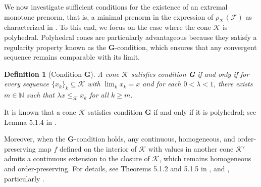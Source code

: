 \documentclass{article}
\newtheorem{definition}[theorem]{Definition}
\newcommand{\family}{\mathcal{F}}
\newcommand{\cradius}{\rho_{\cone}}
\newcommand{\cone}{\mathcal{K}}
\newcommand{\cleq}{\leq_{\cone}}
\begin{document}
We now investigate sufficient conditions for the existence of an extremal monotone prenorm, that is, a minimal prenorm in the expression of $\cradius(\family)$ as characterized in . To this end, we focus on the case where the cone $\cone$ is polyhedral. Polyhedral cones are particularly advantageous because they satisfy a regularity property known as the \textbf{G}-condition, which ensures that any convergent sequence remains comparable with its limit.

\begin{definition}[Condition \textbf{G}]\label{Def_G_condition}
    A cone $\cone$ satisfies condition \textbf{G} if and only if for every sequence $\{x_k\}_k \subseteq \cone$ with $\lim_k x_k = x$ and for each $0 < \lambda < 1$, there exists $m \in \mathbb{N}$ such that $\lambda x \cleq x_k$ for all $k \geq m$.
\end{definition}

It is known that a cone $\cone$ satisfies condition \textbf{G} if and only if it is polyhedral; see Lemma 5.1.4 in \cite{lemmens2012nonlinear}.

Moreover, when the \textbf{G}-condition holds, any continuous, homogeneous, and order-preserving map $f$ defined on the interior of $\cone$ with values in another cone $\cone'$ admits a continuous extension to the closure of $\cone$, which remains homogeneous and order-preserving. For details, see Theorems 5.1.2 and 5.1.5 in \cite{lemmens2012nonlinear}, and , particularly .
\end{document}
